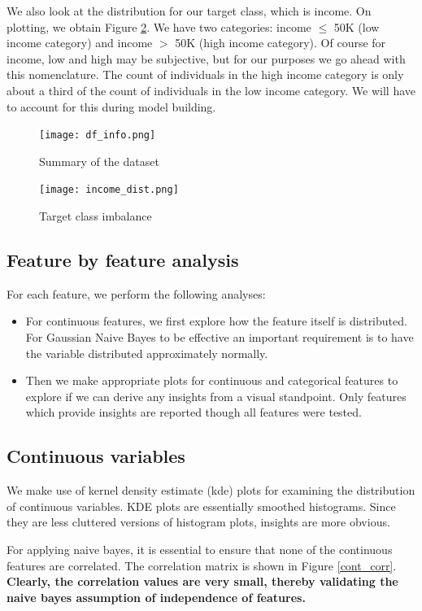 \documentclass[conference]{IEEEtran}
\begin{document}
We also look at the distribution for our target class, which is income. On plotting, we obtain Figure \ref{income_dist}. We have two categories: income $\leq$ 50K (low income category) and income $>$ 50K (high income category). Of course for income, low and high may be subjective, but for our purposes we go ahead with this nomenclature. The count of individuals in the high income category is only about a third of the count of individuals in the low income category. We will have to account for this during model building.

\begin{figure}[tbh]
\centering
\texttt{[image: df\_info.png]}
\caption{Summary of the dataset}
\label{df_info}
\end{figure}

\begin{figure}[tbh]
\centering
\texttt{[image: income\_dist.png]}
\caption{Target class imbalance}
\label{income_dist}
\end{figure}

\subsection{Feature by feature analysis}

For each feature, we perform the following analyses:

\begin{itemize}
    \item For continuous features, we first explore how the feature itself is distributed. For Gaussian Naive Bayes to be effective an important requirement is to have the variable distributed approximately normally.
    \item Then we make appropriate plots for continuous and categorical features to explore if we can derive any insights from a visual standpoint. Only features which provide insights are reported though all features were tested.
\end{itemize}

\subsection*{Continuous variables}

We make use of kernel density estimate (kde) plots for examining the distribution of continuous variables. KDE plots are essentially smoothed histograms. Since they are less cluttered versions of histogram plots, insights are more obvious. 

For applying naive bayes, it is essential to ensure that none of the continuous features are correlated. The correlation matrix is shown in Figure \ref{cont_corr}. \textbf{Clearly, the correlation values are very small, thereby validating the naive bayes assumption of independence of features.}
\end{document}
